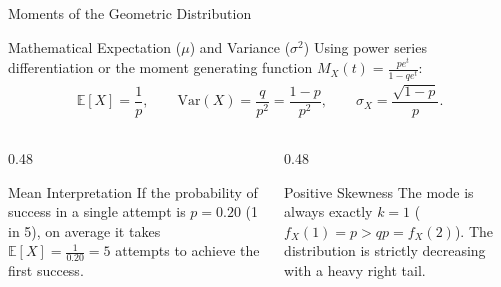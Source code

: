 \documentclass[aspectratio=169,xcolor={dvipsnames,table}]{beamer}
\begin{document}
\begin{frame}{Moments of the Geometric Distribution}
	\begin{block}{Mathematical Expectation ($\mu$) and Variance ($\sigma^2$)}
		\small
		Using power series differentiation or the moment generating function $M_X(t) = \frac{pe^t}{1-qe^t}$:
		\begin{align*}
			\mathbb{E}[X] = \dfrac{1}{p}, \qquad \text{Var}(X) = \dfrac{q}{p^2} = \dfrac{1-p}{p^2}, \qquad \sigma_X = \dfrac{\sqrt{1-p}}{p}.
		\end{align*}
	\end{block}
	\vspace{-0.15cm}
	\begin{columns}[T]
		\begin{column}{0.48\textwidth}
			\begin{exampleblock}{Mean Interpretation}
				\footnotesize
				If the probability of success in a single attempt is $p = 0.20$ (1 in 5), on average it takes $\mathbb{E}[X] = \frac{1}{0.20} = 5$ attempts to achieve the first success.
			\end{exampleblock}
		\end{column}
		\begin{column}{0.48\textwidth}
			\begin{alertblock}{Positive Skewness}
				\footnotesize
				The mode is always exactly $k=1$ ($f_X(1)=p > qp = f_X(2)$). The distribution is strictly decreasing with a heavy right tail.
			\end{alertblock}
		\end{column}
	\end{columns}
\end{frame}
\end{document}
